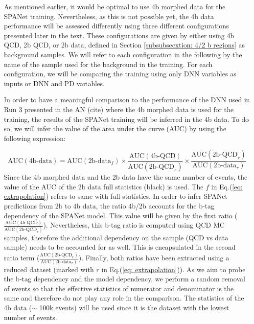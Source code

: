 As mentioned earlier, it would be optimal to use 4b morphed data for the SPANet training. Nevertheless, as this is not possible yet, the 4b data performance will be assessed differently using three different configurations presented later in the text. These configurations are given by either using 4b QCD, 2b QCD, or 2b data, defined in Section \ref{subsubsecxtion: 4/2 b regions} as background samples. We will refer to each configuration in the following by the name of the sample used for the background in the training. For each configuration, we will be comparing the training using only DNN variables as inputs or DNN and PD variables.

In order to have a meaningful comparison to the performance of the DNN used in Run 3 presented in the AN (cite) where the 4b morphed data is used for the training, the results of the SPANet training will be inferred in the 4b data. To do so, we will infer the value of the area under the curve (AUC) by using the following expression:

\begin{equation}
    \text{AUC}(\text{4b-data})= \text{AUC}(\text{2b-data}_f) \times {\frac{\text{AUC}(\text{4b-QCD})}{\text{AUC}(\text{2b-QCD}_r)}} \times {\frac{\text{AUC}(\text{2b-QCD}_r)}{\text{AUC}(\text{2b-data}_r)}}
    \label{eq: extrapolation}
\end{equation} 
\noindent Since the 4b morphed data and the 2b data have the same number of events, the value of the AUC of the 2b data full statistics (black) is used. The $f$ in Eq.(\ref{eq: extrapolation}) refers to same with full statistics. In order to infer SPANet predictions from 2b to 4b data, the ratio 4b/2b accounts for the b-tag dependency of the SPANet model. This value will be given by the first ratio (${\frac{\text{AUC}(\text{4b-QCD})}{\text{AUC}(\text{2b-QCD}_r)}}$). Nevertheless, this b-tag ratio is computed using QCD MC samples, therefore the additional dependency on the sample (QCD vs data sample) needs to be accounted for as well. This is encapsulated in the second ratio term (${\frac{\text{AUC}(\text{2b-QCD}_r)}{\text{AUC}(\text{2b-data}_r)}}$). Finally, both ratios have been extracted using a reduced dataset (marked with $r$ in Eq.(\ref{eq: extrapolation})). As we aim to probe the b-tag dependency and the model dependency, we perform a random removal of events so that the effective statistics of numerator and denominator is the same and therefore do not play any role in the comparison. The statistics of the 4b data ($\sim$ 100k events) will be used since it is the dataset with the lowest number of events.

